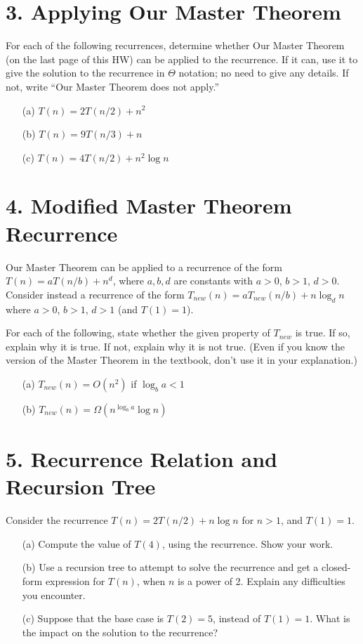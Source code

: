 \documentclass{article}
\begin{document}
\section*{3. Applying Our Master Theorem}

For each of the following recurrences, determine whether Our Master Theorem (on the last page of this HW) can be applied to the recurrence. If it can, use it to give the solution to the recurrence in $\Theta$ notation; no need to give any details. If not, write “Our Master Theorem does not apply.”

\begin{enumerate}
    \item[(a)] $T(n) = 2T(n/2) + n^2$
    \item[(b)] $T(n) = 9T(n/3) + n$
    \item[(c)] $T(n) = 4T(n/2) + n^2 \log n$
\end{enumerate}

\section*{4. Modified Master Theorem Recurrence}

Our Master Theorem can be applied to a recurrence of the form $T(n) = aT(n/b) + n^d$, where $a, b, d$ are constants with $a > 0$, $b > 1$, $d > 0$. Consider instead a recurrence of the form $T_{new}(n) = aT_{new}(n/b) + n \log_d n$ where $a > 0$, $b > 1$, $d > 1$ (and $T(1) = 1$).

For each of the following, state whether the given property of $T_{new}$ is true. If so, explain why it is true. If not, explain why it is not true. (Even if you know the version of the Master Theorem in the textbook, don’t use it in your explanation.)

\begin{enumerate}
    \item[(a)] $T_{new}(n) = O(n^2)$ if $\log_b a < 1$
    \item[(b)] $T_{new}(n) = \Omega(n^{\log_b a} \log n)$
\end{enumerate}

\section*{5. Recurrence Relation and Recursion Tree}

Consider the recurrence $T(n) = 2T(n/2) + n \log n$ for $n > 1$, and $T(1) = 1$.

\begin{enumerate}
    \item[(a)] Compute the value of $T(4)$, using the recurrence. Show your work.
    \item[(b)] Use a recursion tree to attempt to solve the recurrence and get a closed-form expression for $T(n)$, when $n$ is a power of 2.  Explain any difficulties you encounter.
    \item[(c)] Suppose that the base case is $T(2) = 5$, instead of $T(1) = 1$. What is the impact on the solution to the recurrence?
\end{enumerate}
\end{document}
